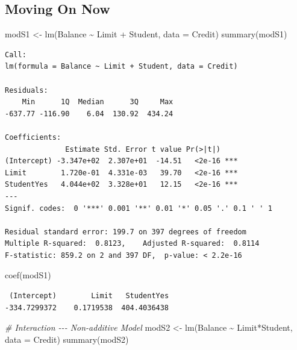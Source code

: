 \documentclass[
]{article}
\newenvironment{Shaded}{\begin{snugshade}}{\end{snugshade}}
\newcommand{\AttributeTok}[1]{\textcolor[rgb]{0.77,0.63,0.00}{#1}}
\newcommand{\CommentTok}[1]{\textcolor[rgb]{0.56,0.35,0.01}{\textit{#1}}}
\newcommand{\FunctionTok}[1]{\textcolor[rgb]{0.00,0.00,0.00}{#1}}
\newcommand{\NormalTok}[1]{#1}
\newcommand{\OtherTok}[1]{\textcolor[rgb]{0.56,0.35,0.01}{#1}}
\newcommand{\SpecialCharTok}[1]{\textcolor[rgb]{0.00,0.00,0.00}{#1}}
\begin{document}
\hypertarget{moving-on-now}{%
\subsection{Moving On Now}\label{moving-on-now}}

\begin{Shaded}
\begin{Highlighting}[]
\NormalTok{modS1 }\OtherTok{\textless{}{-}} \FunctionTok{lm}\NormalTok{(Balance }\SpecialCharTok{\textasciitilde{}}\NormalTok{ Limit }\SpecialCharTok{+}\NormalTok{ Student, }\AttributeTok{data =}\NormalTok{ Credit)}
\FunctionTok{summary}\NormalTok{(modS1)}
\end{Highlighting}
\end{Shaded}

\begin{verbatim}
Call:
lm(formula = Balance ~ Limit + Student, data = Credit)

Residuals:
    Min      1Q  Median      3Q     Max 
-637.77 -116.90    6.04  130.92  434.24 

Coefficients:
              Estimate Std. Error t value Pr(>|t|)    
(Intercept) -3.347e+02  2.307e+01  -14.51   <2e-16 ***
Limit        1.720e-01  4.331e-03   39.70   <2e-16 ***
StudentYes   4.044e+02  3.328e+01   12.15   <2e-16 ***
---
Signif. codes:  0 '***' 0.001 '**' 0.01 '*' 0.05 '.' 0.1 ' ' 1

Residual standard error: 199.7 on 397 degrees of freedom
Multiple R-squared:  0.8123,    Adjusted R-squared:  0.8114 
F-statistic: 859.2 on 2 and 397 DF,  p-value: < 2.2e-16
\end{verbatim}

\begin{Shaded}
\begin{Highlighting}[]
\FunctionTok{coef}\NormalTok{(modS1)}
\end{Highlighting}
\end{Shaded}

\begin{verbatim}
 (Intercept)        Limit   StudentYes 
-334.7299372    0.1719538  404.4036438 
\end{verbatim}

\begin{Shaded}
\begin{Highlighting}[]
\CommentTok{\# Interaction {-}{-}{-} Non{-}additive Model}
\NormalTok{modS2 }\OtherTok{\textless{}{-}} \FunctionTok{lm}\NormalTok{(Balance }\SpecialCharTok{\textasciitilde{}}\NormalTok{ Limit}\SpecialCharTok{*}\NormalTok{Student, }\AttributeTok{data =}\NormalTok{ Credit)}
\FunctionTok{summary}\NormalTok{(modS2)}
\end{Highlighting}
\end{Shaded}
\end{document}
